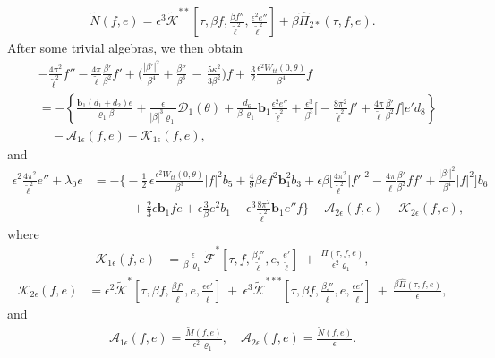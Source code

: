\documentclass[10pt, reqno]{amsart}
\numberwithin{equation}{section}
\theoremstyle{definition}
\begin{document}
{\begin{align*}
 \tilde N(f, e) = \epsilon^3 \tilde{\mathcal K}^{**} \left[\tau, \beta f, \frac{\beta f''}{\tilde\ell^2}, \frac{\epsilon^2 e''}{\tilde \ell^2}\right]+\beta \hat\Pi_{2*}(\tau, f, e).
\end{align*}
After some trivial algebras, we then obtain
\begin{align} \label{last reduced equation on U'}
 & - \frac{4\pi^2}{{\tilde\ell}^2}{f}'' - \frac{4\pi}{\tilde\ell} \frac{\beta'}{\beta^2} f'
+ \Big(\frac{|\beta'|^2}{\beta^4}
+\frac{\beta''} {\beta^3}
\,-\,\frac{5\kappa^2}{3\beta^2} \Big) f
+ \, \frac 32\frac{\epsilon^2W_{tt}(0, \theta)}{\beta^4} f
\nonumber\\[2mm]
 &
= -\left\{ \frac {{\mathbf b}_1(d_1+d_2)e}{\varrho_1\beta}
+\frac{\epsilon}{|\beta|^3 \varrho_1}{\mathcal D}_1(\theta)
+ \frac{d_6} {\beta\, \varrho_1}{\mathbf b}_1 \frac{\epsilon^2 e''}{\tilde\ell^2}
+ \frac{\epsilon^3}{\beta^3}\Big[ -\frac{8\pi^2}{{\tilde\ell}^2}f' +\frac{4\pi}{ {\tilde\ell}}\frac{\beta'}{\beta^2} f\Big]e'd_8 \right\}
\nonumber\\[2mm]
 &\quad -\mathcal A_{1\epsilon} (f, e) - \mathcal K_{1\epsilon} (f, e),
\end{align}
and
\begin{align} \label{last reduced equation on mathcal Z}
 \epsilon^2\frac{4\pi^2}{{\tilde\ell}^2} e'' + \lambda_0 e & =
 - \Bigg\{-\frac{1}{2}\, \epsilon \frac{ \epsilon^2W_{tt}(0, \theta)}{\beta^3}|f|^2 b_5+\frac{4}{9} \beta\epsilon f^2 {\mathbf b}_1^2 b_3 + \epsilon\beta\Big[\frac{4\pi^2}{{\tilde\ell}^2}|f'|^2
-\frac{4\pi}{{\tilde\ell}}\frac{\beta'}{\beta^2}ff'
+\frac{|\beta'|^2}{\beta^4} |f|^2
\Big] b_6
\nonumber\\[2mm]
 & \qquad\quad
 +\frac 23\epsilon {\mathbf b}_1 fe + \epsilon \frac3{\beta}e^2b_1 - \epsilon^3 \frac{8\pi^2} {{\tilde\ell}^2} {\mathbf b}_1 e'' f \Bigg\}- \mathcal A_{2\epsilon} (f, e) - \mathcal K_{2\epsilon} (f, e),
\end{align}
where
\begin{align*}
\mathcal K_{1\epsilon} (f, e)
& =
\frac{\epsilon}{\beta\, \varrho_1}\tilde{\mathcal F}^{*} \left[\tau, f, \frac{\beta {f}'}{\tilde\ell}, e, \frac{e'}{\tilde\ell}\right]
\ +\
\frac{ \Pi(\tau, f, e) }{\epsilon^2\varrho_1},
\end{align*}
\begin{align*}
\mathcal K_{2\epsilon} (f, e)
&= \epsilon^2 \tilde{\mathcal K}^* \left[\tau, \beta f, \frac{\beta {f}'}{\tilde\ell}, e, \frac{\epsilon e'}{\tilde\ell}\right]
\ +\
\epsilon^3 \tilde{\mathcal K}^{***} \left[\tau, \beta f, \frac{\beta {f}'}{\tilde\ell}, e, \frac{\epsilon e'}{\tilde\ell}\right]
\ +\
\frac{\beta  \hat\Pi(\tau, f, e) }\epsilon,
\end{align*}
 and
\begin{align*}
 \mathcal A_{1\epsilon} (f, e) = \frac{\tilde M(f, e)} {\epsilon^2\, \varrho_1}, \quad \mathcal A_{2\epsilon} (f, e) =\frac{\tilde N(f, e)} {\epsilon}.
\end{align*}


}
\end{document}

